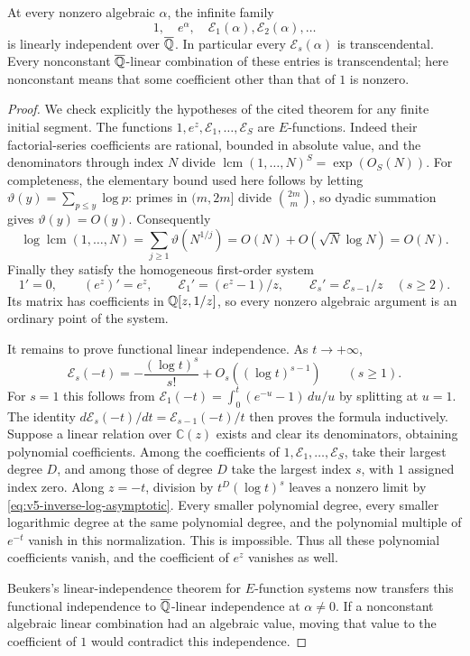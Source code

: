 \begin{theorem}
\label{thm:v5-classical-inverse}
At every nonzero algebraic $\alpha$, the infinite family
\[
 1,\quad e^\alpha,\quad
 \mathcal E_1(\alpha),\mathcal E_2(\alpha),\ldots
\]
is linearly independent over $\overline{\mathbb Q}$.  In particular every
$\mathcal E_s(\alpha)$ is transcendental.  Every nonconstant
$\overline{\mathbb Q}$-linear combination of these entries is transcendental;
here nonconstant means that some coefficient other than that of $1$
is nonzero.
\end{theorem}
\begin{proof}
We check explicitly the hypotheses of the cited theorem for any finite
initial segment.  The functions $1,e^z,\mathcal E_1,\ldots,\mathcal E_S$
are $E$-functions.  Indeed their factorial-series coefficients are rational,
bounded in absolute value, and the denominators through index $N$ divide
$\operatorname{lcm}(1,\ldots,N)^S=\exp(O_S(N))$.  For completeness, the
elementary bound used here follows by letting
$\vartheta(y)=\sum_{p\leq y}\log p$: primes in $(m,2m]$ divide
$\binom{2m}{m}$, so dyadic summation gives $\vartheta(y)=O(y)$.
Consequently
\[
 \log\operatorname{lcm}(1,\ldots,N)
 =\sum_{j\geq1}\vartheta(N^{1/j})
 =O(N)+O(\sqrt N\log N)=O(N).
\]
Finally they satisfy the homogeneous first-order system
\[
 1'=0,\qquad (e^z)'=e^z,\qquad
 \mathcal E_1'=(e^z-1)/z,\qquad
 \mathcal E_s'=\mathcal E_{s-1}/z\quad(s\geq2).
\]
Its matrix has coefficients in $\mathbb Q[z,1/z]$, so every nonzero
algebraic argument is an ordinary point of the system.

It remains to prove functional linear independence.  As $t\to+\infty$,
\begin{equation}
 \mathcal E_s(-t)
 =-\frac{(\log t)^s}{s!}+O_s((\log t)^{s-1})
 \qquad(s\geq1).
 \label{eq:v5-inverse-log-asymptotic}
\end{equation}
For $s=1$ this follows from
$\mathcal E_1(-t)=\int_0^t(e^{-u}-1)\,du/u$ by splitting at $u=1$.
The identity $d\mathcal E_s(-t)/dt=\mathcal E_{s-1}(-t)/t$
then proves the formula inductively.
Suppose a linear relation over $\mathbb C(z)$ exists and clear its
denominators, obtaining polynomial coefficients.  Among the coefficients
of $1,\mathcal E_1,\ldots,\mathcal E_S$, take their largest degree
$D$, and among those of degree $D$ take the largest index $s$, with
$1$ assigned index zero.  Along $z=-t$, division by
$t^D(\log t)^s$ leaves a nonzero limit by
\eqref{eq:v5-inverse-log-asymptotic}.  Every smaller polynomial degree,
every smaller logarithmic degree at the same polynomial degree, and
the polynomial multiple of $e^{-t}$ vanish in this normalization.
This is impossible.  Thus all these polynomial coefficients vanish,
and the coefficient of $e^z$ vanishes as well.

Beukers's linear-independence theorem for $E$-function systems now
transfers this functional independence to
$\overline{\mathbb Q}$-linear independence at $\alpha\ne0$.
If a nonconstant algebraic linear combination had an algebraic value,
moving that value to the coefficient of $1$ would contradict this
independence.
\end{proof}

